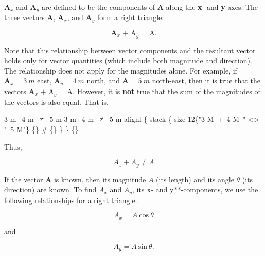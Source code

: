 \documentclass[
]{book}
\begin{document}
\(\mathbf{A}_{x}{}\) and \(\mathbf{A}_{y}{}\) are defined to be the
components of \emph{}\(\mathbf{A}{}\) along the
\textbf{x}- and \textbf{y}-axes. The three vectors \(\mathbf{A}{}\),
\(\mathbf{A}_{x}{}\), and \(\mathbf{A}_{y}{}\) form a right triangle:

\leavevmode\hypertarget{eip-680}{}%
\[{{\mathbf{A}_{x}\text{~+~A}_{y}\text{~=~A}}\text{.}}{}\]

Note that this relationship between vector components and the resultant
vector holds only for vector quantities (which include both magnitude
and direction). The relationship does not apply for the magnitudes
alone. For example, if \({\textbf{A}_{x} = 3\ m}{}\) east,
\({\textbf{A}_{y} = 4\ m}{}\) north, and \({\textbf{A} = 5\ m}{}\)
north-east, then it is true that the vectors
\({\mathbf{A}_{x}\text{~+~A}_{y}\text{~=~A}}{}\). However, it is \textbf{not}
true that the sum of the magnitudes of the vectors is also equal. That
is,

\leavevmode\hypertarget{eip-818}{}%
{3 m+4 m~ ≠ ~5 m 3 m+4 m~ ≠ ~5 m alignl \{ stack \{ size 12\{"3 M~+~4
M~" \textless\textgreater{} "~5 M"\} \{\} \# \{\} \} \} \{\}}

Thus,

\leavevmode\hypertarget{eip-505}{}%
\[{{A_{x} + A_{y}} \neq A}{}\]

If the vector \(\mathbf{A}{}\) is known, then its magnitude \(A{}\) (its
length) and its angle \(\theta{}\) (its direction) are known. To find
\(A_{x}{}\)\emph{} and
\emph{}\(A_{y}{}\), its \textbf{x}- and
\emph{}y**-components, we use the following
relationships for a right triangle.

\leavevmode\hypertarget{eip-377}{}%
\[{{A_{x} = A}\ \text{cos}\ \theta}{}\]

and

\leavevmode\hypertarget{eip-69}{}%
\[{{A_{y} = A}\ \text{sin}\ \theta}\text{.}{}\]
\end{document}
